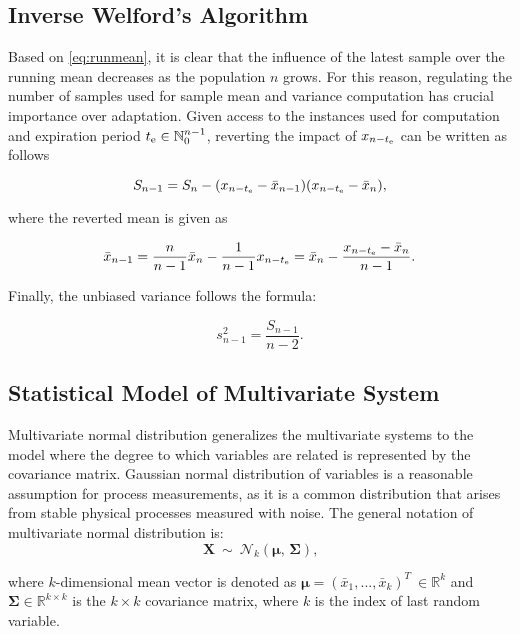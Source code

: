 \subsection{Inverse Welford's Algorithm}\label{AA:InvWelford}
Based on \eqref{eq:runmean}, it is clear that the influence of the latest sample over the running mean decreases as the population \(n\) grows. For this reason, regulating the number of samples used for sample mean and variance computation has crucial importance over adaptation. Given access to the instances used for computation and expiration period \(t _{\text{e}} \in \mathbb{N}_{0}^{n-1}\), reverting the impact of \(x_{n-t _{\text{e}}}\) can be written as follows

\begin{equation}
S_{n-1} = S_n - (x_{n-t _{\text{e}}} - \bar x_{n-1})(x_{n-t _{\text{e}}} - \bar x_n)\text{,}\label{eq:revrunmean}
\end{equation}

where the reverted mean is given as

\begin{equation}
\bar x_{n-1} = \frac{n}{n-1} \bar x_{n} - \frac{1}{n-1}x_{n-t _{\text{e}}} = \bar x_{n} - \frac{x_{n-t _{\text{e}}} - \bar x_{n}}{n-1}\text{.}\label{eq:revmean}
\end{equation}


Finally, the unbiased variance follows the formula:

\begin{equation}
s^2_{n-1} = \frac{S_{n-1}}{n-2}\text{.}\label{eq:revvar}
\end{equation}

\subsection{Statistical Model of Multivariate System}\label{AA:Distribution}
Multivariate normal distribution generalizes the multivariate systems to the model where the degree to which variables are related is represented by the covariance matrix. Gaussian normal distribution of variables is a reasonable assumption for process measurements, as it is a common distribution that arises from stable physical processes measured with noise. The general notation of multivariate normal distribution is:
\begin{equation}
 \mathbf{X}\ \sim\ \mathcal{N}_k(\boldsymbol\mu,\, \boldsymbol\Sigma)\text{,}\label{eq:distribution}
\end{equation}

where $k$-dimensional mean vector is denoted as \(\boldsymbol\mu = (\bar x_{1},...,\bar x_{k})^T\ \in \mathbb{R}^{k}\) and \(\boldsymbol\Sigma \in \mathbb{R}^{k\times{k}}\) is the $k \times k$ covariance matrix, where \(k\) is the index of last random variable.

